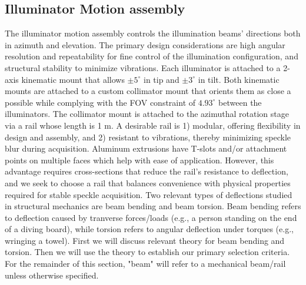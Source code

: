 \subsection{Illuminator Motion assembly}
The illuminator motion assembly controls the illumination beams' directions both in azimuth and elevation. The primary design considerations are high angular resolution and repeatability for fine control of the illumination configuration, and structural stability to minimize vibrations. Each illuminator is attached to a 2-axis kinematic mount that allows $\pm 5^\circ$ in tip and  $\pm 3^\circ$ in tilt. Both kinematic mounts are attached to a custom collimator mount that orients them as close a possible while complying with the FOV constraint of $4.93^\circ$ between the illuminators. The collimator mount is attached to the azimuthal rotation stage via a rail whose length is 1 \si{\m}. A desirable rail is 1) modular, offering flexibility in design and assembly, and 2) resistant to vibrations, thereby minimizing speckle blur during acquisition. Aluminum extrusions have T-slots and/or attachment points on multiple faces which help with ease of application. However, this advantage requires cross-sections that reduce the rail's resistance to deflection, and we seek to choose a rail that balances convenience with physical properties required for stable speckle acquisition. Two relevant types of deflections studied in structural mechanics are beam bending and beam torsion. Beam bending refers to deflection caused by tranverse forces/loads (e.g., a person standing on the end of a diving board), while torsion refers to angular deflection under torques (e.g., wringing a towel). First we will discuss relevant theory for beam bending and torsion. Then we will use the theory to establish our primary selection criteria. For the remainder of this section, "beam" will refer to a mechanical beam/rail unless otherwise specified.

